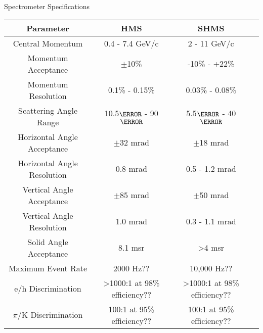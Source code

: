 \begin{Mtable}{Spectrometer Specifications}
  \centering
  \begin{tabular}{|c|c|c|c|}
    \hline
    \textbf{Parameter} & \textbf{HMS} & \textbf{SHMS}\\
    \hline
    Central Momentum & 0.4 - 7.4 GeV/c & 2 - 11 GeV/c \\
    Momentum Acceptance & $\pm$10\% & -10\% - +22\% \\
    Momentum Resolution & 0.1\% - 0.15\% & 0.03\% - 0.08\% \\
    Scattering Angle Range & 10.5$\degree$ - 90$\degree$ & 5.5$\degree$ - 40$\degree$ \\
    \hline
    Horizontal Angle Acceptance & $\pm$32 mrad & $\pm$18 mrad \\
    Horizontal Angle Resolution & 0.8 mrad & 0.5 - 1.2 mrad \\
    Vertical Angle Acceptance & $\pm$85 mrad & $\pm$50 mrad \\
    Vertical Angle Resolution & 1.0 mrad & 0.3 - 1.1 mrad \\
    Solid Angle Acceptance & 8.1 msr & >4 msr \\
    \hline
    Maximum Event Rate & 2000 Hz?? & 10,000 Hz?? \\
    e/h Discrimination & >1000:1 at 98\% efficiency?? & >1000:1 at 98\% efficiency?? \\
    $\pi$/K Discrimination & 100:1 at 95\% efficiency?? & 100:1 at 95\% efficiency?? \\
    \hline
  \end{tabular}
  \caption{Break down of the HMS and SHMS specifications and capablilities..}  
  \label{tab:2-4_spectrometer}
\end{Mtable}

